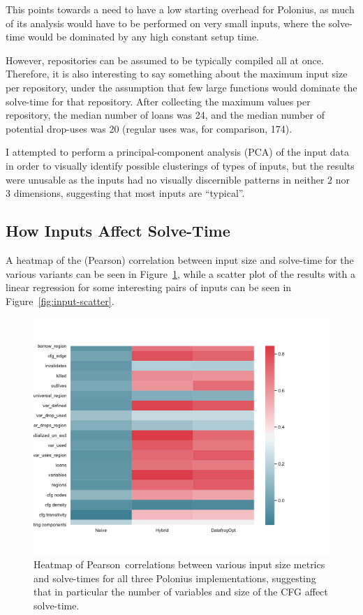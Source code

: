 \documentclass[11pt,a4paper,twoside,openany]{report}
\begin{document}
This points towards a need to have a low starting overhead for Polonius, as
much of its analysis would have to be performed on very small inputs, where the
solve-time would be dominated by any high constant setup time.

However, repositories can be assumed to be typically compiled all at once.
Therefore, it is also interesting to say something about the maximum input size
per repository, under the assumption that few large functions would dominate the
solve-time for that repository. After collecting the maximum values per repository,
the median number of loans was 24, and the median number of potential drop-uses
was 20 (regular uses was, for comparison, 174).

I attempted to perform a principal-component analysis (PCA) of the input data in
order to visually identify possible clusterings of types of inputs, but the
results were unusable as the inputs had no visually discernible patterns in
neither 2 nor 3 dimensions, suggesting that most inputs are ``typical''.

\subsection{How Inputs Affect Solve-Time}\label{sec:inputs:correlation}

A heatmap of the (Pearson) correlation between input size and solve-time for the
various variants can be seen in Figure~\ref{fig:corr-heatmap}, while a scatter
plot of the results with a linear regression for some interesting pairs of
inputs can be seen in Figure~\ref{fig:input-scatter}.

\begin{figure}
  \includegraphics[width=0.9\linewidth]{Graphs/corr_heatmap.pdf}
  \caption{Heatmap of Pearson~correlations between various input size metrics
    and solve-times for all three Polonius implementations, suggesting that in
    particular the number of variables and size of the CFG affect solve-time.}
  \label{fig:corr-heatmap}
\end{figure}
\end{document}
